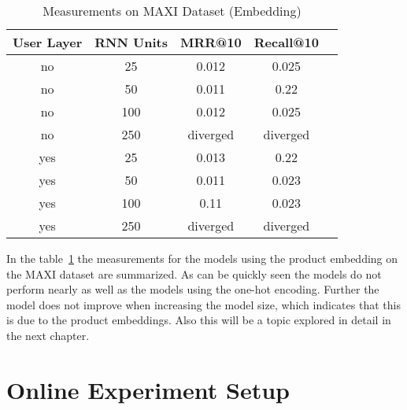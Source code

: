 \begin{table}[t]
    \centering
    \begin{tabular}{|c|c|c|c|c|}
        \hline
        User Layer & RNN Units & MRR@10 & Recall@10 \\ \hline
        no & 25 & 0.012 & 0.025 \\ \hline
        no & 50 & 0.011 & 0.22 \\ \hline
        no & 100 & 0.012 & 0.025 \\ \hline
        no & 250 & diverged & diverged \\ \hline
        yes & 25 & 0.013 & 0.22 \\ \hline
        yes & 50 & 0.011 & 0.023 \\ \hline
        yes & 100 & 0.11 & 0.023 \\ \hline
        yes & 250 & diverged & diverged \\ \hline
    \end{tabular}
    \caption{Measurements on MAXI Dataset (Embedding)}
    \label{tab:maxi_dataset_measurements_embedding}
\end{table}
In the table~\ref{tab:maxi_dataset_measurements_embedding} the measurements for the models using the product embedding on the MAXI dataset are summarized.
As can be quickly seen the models do not perform nearly as well as the models using the one-hot encoding.
Further the model does not improve when increasing the model size, which indicates that this is due to the product embeddings.
Also this will be a topic explored in detail in the next chapter.
\section{Online Experiment Setup}
